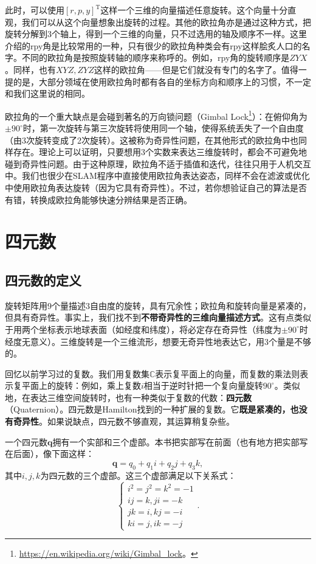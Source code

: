 此时，可以使用$[r,p,y]^\mathrm{T}$这样一个三维的向量描述任意旋转。这个向量十分直观，我们可以从这个向量想象出旋转的过程。其他的欧拉角亦是通过这种方式，把旋转分解到3个轴上，得到一个三维的向量，只不过选用的轴及顺序不一样。这里介绍的rpy角是比较常用的一种，只有很少的欧拉角种类会有rpy这样脍炙人口的名字。不同的欧拉角是按照旋转轴的顺序来称呼的。例如，rpy角的旋转顺序是$ZYX$。同样，也有$XYZ, ZYZ$这样的欧拉角——但是它们就没有专门的名字了。值得一提的是，大部分领域在使用欧拉角时都有各自的坐标方向和顺序上的习惯，不一定和我们这里说的相同。

欧拉角的一个重大缺点是会碰到著名的万向锁问题（Gimbal Lock\footnote{\url{https://en.wikipedia.org/wiki/Gimbal_lock}。}）：在俯仰角为$\pm 90 ^\circ $时，第一次旋转与第三次旋转将使用同一个轴，使得系统丢失了一个自由度（由3次旋转变成了2次旋转）。这被称为奇异性问题，在其他形式的欧拉角中也同样存在。理论上可以证明，只要想用3个实数来表达三维旋转时，都会不可避免地碰到奇异性问题。由于这种原理，欧拉角不适于插值和迭代，往往只用于人机交互中。我们也很少在SLAM程序中直接使用欧拉角表达姿态，同样不会在滤波或优化中使用欧拉角表达旋转（因为它具有奇异性）。不过，若你想验证自己的算法是否有错，转换成欧拉角能够快速分辨结果是否正确。

\section{四元数}
\subsection{四元数的定义}
旋转矩阵用9个量描述3自由度的旋转，具有冗余性；欧拉角和旋转向量是紧凑的，但具有奇异性。事实上，我们找不到\textbf{不带奇异性的三维向量描述方式}\textsuperscript{\cite{Stuelpnagel1964}}。这有点类似于用两个坐标表示地球表面（如经度和纬度），将必定存在奇异性（纬度为$\pm 90^\circ$时经度无意义）。三维旋转是一个三维流形，想要无奇异性地表达它，用3个量是不够的。

回忆以前学习过的复数。我们用复数集$\mathbb{C}$表示复平面上的向量，而复数的乘法则表示复平面上的旋转：例如，乘上复数$i$相当于逆时针把一个复向量旋转$90^\circ$。类似地，在表达三维空间旋转时，也有一种类似于复数的代数：\textbf{四元数}（Quaternion）。四元数是Hamilton找到的一种扩展的复数。它\textbf{既是紧凑的，也没有奇异性}。如果说缺点，四元数不够直观，其运算稍复杂些。

一个四元数$\bm{q}$拥有一个实部和三个虚部。本书把实部写在前面（也有地方把实部写在后面），像下面这样：
\begin{equation}
 \bm{q} = q_0 + q_1 i + q_2 j + q_3 k,
\end{equation}
其中$i,j,k$为四元数的三个虚部。这三个虚部满足以下关系式：
\clearpage
\begin{equation}
\label{eq:quaternionVirtual}
\left\{ \begin{array}{l}
{i^2} = {j^2} = {k^2} =  - 1\\
ij = k,ji =  - k\\
jk = i,kj =  - i\\
ki = j,ik =  - j
\end{array} \right. .
\end{equation}

